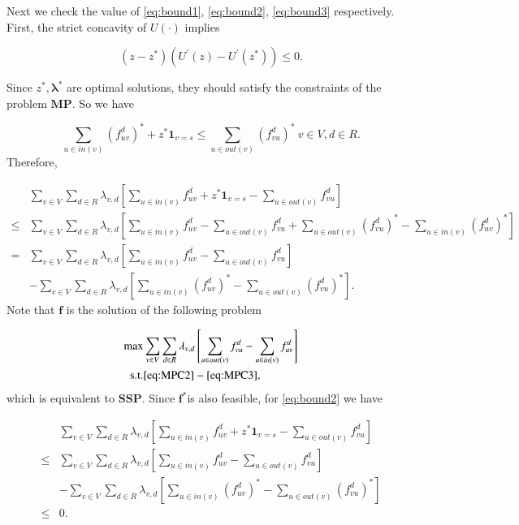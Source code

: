 \documentclass[10pt,conference]{IEEEtran}
\begin{document}
Next we check the value of \eqref{eq:bound1}, \eqref{eq:bound2},
\eqref{eq:bound3} respectively. First, the strict concavity of $U(\cdot)$
implies

\begin{equation}
(z-z^{*})\left(U^{'}(z)-U^{'}(z^{*})\right)\leq0.\end{equation}


Since $z^{*},\boldsymbol{\lambda}^{*}$ are optimal solutions, they
should satisfy the constraints of the problem $\mathbf{MP}$. So we
have

\[
\sum_{u\in in(v)}(f_{uv}^{d})^{*}+z^{*}\mathbf{1}_{v=s}\leq\sum_{u\in out(v)}(f_{vu}^{d})^{*}\: v\in V,d\in R.\]
Therefore,

\begin{align*}
 & \sum_{v\in V}\sum_{d\in R}\lambda_{v,d}\left[\sum_{u\in in(v)}f_{uv}^{d}+z^{*}\mathbf{1}_{v=s}-\sum_{u\in out(v)}f_{vu}^{d}\right]\\
\leq & \sum_{v\in V}\sum_{d\in R}\lambda_{v,d}\left[\sum_{u\in in(v)}f_{uv}^{d}-\sum_{u\in out(v)}f_{vu}^{d}+\sum_{u\in out(v)}(f_{vu}^{d})^{*}-\sum_{u\in in(v)}(f_{uv}^{d})^{*}\right]\\
= & \sum_{v\in V}\sum_{d\in R}\lambda_{v,d}\left[\sum_{u\in in(v)}f_{uv}^{d}-\sum_{u\in out(v)}f_{vu}^{d}\right]\\
 & -\sum_{v\in V}\sum_{d\in R}\lambda_{v,d}\left[\sum_{u\in in(v)}(f_{uv}^{d})^{*}-\sum_{u\in out(v)}(f_{vu}^{d})^{*}\right].\end{align*}
Note that $\boldsymbol{f}$ is the solution of the following problem

\begin{align*}
\max & \sum_{v\in V}\sum_{d\in R}\lambda_{v,d}\left[\sum_{u\in out(v)}f_{vu}^{d}-\sum_{u\in in(v)}f_{uv}^{d}\right]\\
\mbox{s.t.} & \eqref{eq:MPC2}-\eqref{eq:MPC3},\end{align*}
which is equivalent to $\mathbf{SSP}$. Since $\boldsymbol{f}^{*}$is
also feasible, for \eqref{eq:bound2} we have

\begin{align*}
 & \sum_{v\in V}\sum_{d\in R}\lambda_{v,d}\left[\sum_{u\in in(v)}f_{uv}^{d}+z^{*}\mathbf{1}_{v=s}-\sum_{u\in out(v)}f_{vu}^{d}\right]\\
\leq & \sum_{v\in V}\sum_{d\in R}\lambda_{v,d}\left[\sum_{u\in in(v)}f_{uv}^{d}-\sum_{u\in out(v)}f_{vu}^{d}\right]\\
 & -\sum_{v\in V}\sum_{d\in R}\lambda_{v,d}\left[\sum_{u\in in(v)}(f_{uv}^{d})^{*}-\sum_{u\in out(v)}(f_{vu}^{d})^{*}\right]\\
\leq & 0.\end{align*}
\end{document}
